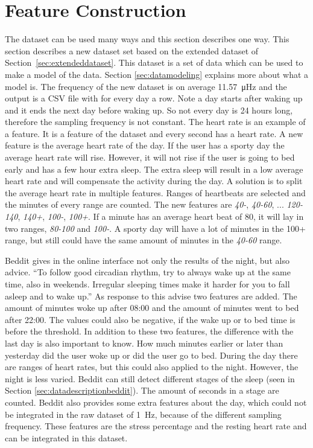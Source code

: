 	\section{Feature Construction}
		\label{sec:feature}
				The dataset can be used many ways and this section describes one way. This section describes a new dataset set based on the extended dataset of Section~\ref{sec:extendeddataset}. This dataset is a set of data which can be used to make a model of the data. Section \ref{sec:datamodeling} explains more about what a model is. The frequency of the new dataset is on average \SI{11.57}{\micro\hertz} and the output is a CSV file with for every day a row. Note a day starts after waking up and it ends the next day before waking up. So not every day is 24 hours long, therefore the sampling frequency is not constant. The heart rate is an example of a feature. It is a feature of the dataset and every second has a heart rate. A new feature is the average heart rate of the day. If the user has a sporty day the average heart rate will rise. However, it will not rise if the user is going to bed early and has a few hour extra sleep. The extra sleep will result in a low average heart rate and will compensate the activity during the day. A solution is to split the average heart rate in multiple features. Ranges of heartbeats are selected and the minutes of every range are counted. The new features are \emph{40-}, \emph{40-60}, ... \emph{120-140}, \emph{140+}, \emph{100-}, \emph{100+}. If a minute has an average heart beat of 80, it will lay in two ranges, \emph{80-100} and \emph{100-}. A sporty day will have a lot of minutes in the 100+ range, but still could have the same amount of minutes in the \emph{40-60} range. 

			Beddit gives in the online interface not only the results of the night, but also advice. ``To follow good circadian rhythm, try to always wake up at the same time, also in weekends. Irregular sleeping times make it harder for you to fall asleep and to wake up.'' As response to this advise two features are added. The amount of minutes woke up after 08:00 and the amount of minutes went to bed after 22:00. The values could also be negative, if the wake up or to bed time is before the threshold. In addition to these two features, the difference with the last day is also important to know. How much minutes earlier or later than yesterday did the user woke up or did the user go to bed. 
			During the day there are ranges of heart rates, but this could also applied to the night. However, the night is less varied. Beddit can still detect different stages of the sleep (seen in Section \ref{sec:datadescriptionbeddit}). The amount of seconds in a stage are counted.
			 Beddit also provides some extra features about the day, which could not be integrated in the raw dataset of \SI{1}{\hertz}, because of the different sampling frequency. These features are the stress percentage and the resting heart rate and can be integrated in this dataset.
				
